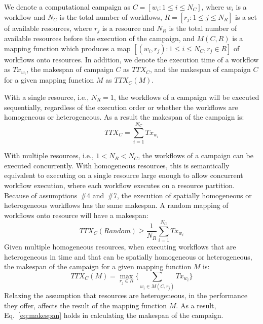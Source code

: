 We denote a computational campaign as $C = [w_{i}: 1 \leq i \leq N_{C}]$, where $w_{i}$ is a workflow and $N_{C}$ is the total number of workflows, $R = [ r_{j}: 1 \leq j \leq N_{R}]$ is a set of available resources, where $r_{j}$ is a resource and $N_{R}$ is the total number of available resources before the execution of the campaign, and $ M(C,R) $ is a mapping function which produces a map $ [(w_i, r_j): 1 \leq i \leq N_{C}, r_j \in R] $ of workflows onto resources.
In addition, we denote the execution time of a workflow as $Tx_{w_{i}}$, the makespan of campaign $C$ as $TTX_{C}$, and the makespan of campaign $C$ for a given mapping function $ M $ as $TTX_{C}(M)$.

With a single resource, i.e., $N_{R} = 1$, the workflows of a campaign will be executed sequentially, regardless of the execution order or whether the workflows are homogeneous or heterogeneous.
As a result the makespan of the campaign is:
\begin{equation}
   TTX_{C} = \sum_{i=1}^{N_{C}}Tx_{w_{i}} 
\end{equation}

With multiple resources, i.e., $1 < N_{R} < N_{C}$, the workflows of a campaign can be executed concurrently.
With homogeneous resources, this is semantically equivalent to executing on a single resource large enough to allow concurrent workflow execution, where each workflow executes on a resource partition. 
Because of assumptions~\#4 and~\#7, the execution of spatially homogeneous or heterogeneous workflows has the same makespan.
A random mapping of workflows onto resource will have a makespan:
\begin{equation}
   TTX_{C}(Random) \geq \frac{1}{N_{R}}\sum_{i=1}^{N_{C}} Tx_{w_{i}} 
\end{equation}
Given multiple homogeneous resources, when executing workflows that are heterogeneous in time and that can be spatially homogeneous or heterogeneous, the makespan of the campaign for a given mapping function $ M $ is:
\begin{equation}
TTX_{C}(M) = \max_{r_{j}\in R}\Big\{\sum_{w_{i}\in M(C,r_{j})}Tx_{w_{i}}\Big\}
\label{eq:makespan}
\end{equation}
Relaxing the assumption that resources are heterogeneous, in the performance they offer, affects the result of the mapping function $ M $.
As a result, Eq.~\ref{eq:makespan} holds in calculating the makespan of the campaign.

